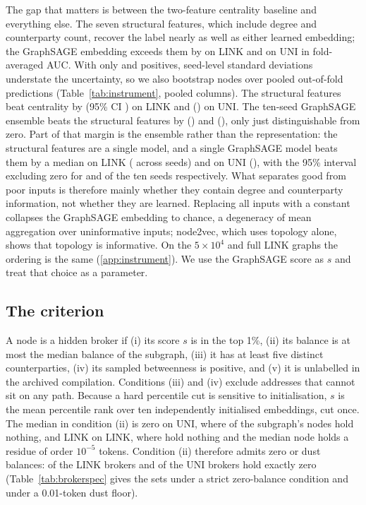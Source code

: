 The gap that matters is between the two-feature centrality baseline and
everything else. The seven structural features, which include degree and
counterparty count, recover the label nearly as well as either learned
embedding; the GraphSAGE embedding exceeds them by  on
LINK and  on UNI in fold-averaged AUC. With only
 and  positives, seed-level standard
deviations understate the uncertainty, so we also bootstrap nodes over pooled
out-of-fold predictions (Table~\ref{tab:instrument}, pooled columns). The
structural features beat centrality by  (95\% CI
) on LINK and 
() on UNI. The ten-seed GraphSAGE ensemble beats
the structural features by 
() and 
(), only just distinguishable from zero. Part of
that margin is the ensemble rather than the representation: the structural
features are a single model, and a single GraphSAGE model beats them by a
median  on LINK ( across
seeds) and  on UNI (), with
the 95\% interval excluding zero for  and
 of the ten seeds respectively. What separates good from poor
inputs is therefore mainly whether they contain degree and counterparty
information, not whether they are learned.
Replacing all inputs with a constant collapses the GraphSAGE embedding to
chance, a degeneracy of mean aggregation over uninformative inputs; node2vec,
which uses topology alone, shows that topology is informative. On the
$5\times10^{4}$ and full LINK graphs the ordering is the same
(\ref{app:instrument}). We use the GraphSAGE score as $s$ and treat that
choice as a parameter.

\subsection{The criterion}
\label{sec:criterion}
A node is a hidden broker if (i) its score $s$ is in the top 1\%, (ii) its
balance is at most the median balance of the subgraph, (iii) it has
at least five distinct counterparties, (iv) its sampled betweenness is
positive, and (v) it is unlabelled in the archived compilation. Conditions
(iii) and (iv) exclude addresses that cannot sit on any path. Because a hard
percentile cut is sensitive to initialisation, $s$ is the mean percentile
rank over ten independently initialised embeddings, cut once.
The median in condition (ii) is zero on UNI, where  of the
subgraph's nodes hold nothing, and  LINK on LINK, where
 hold nothing and the median node holds a residue of order
$10^{-5}$ tokens. Condition (ii) therefore admits zero or
dust balances:  of the LINK brokers and
 of the UNI brokers hold exactly zero
(Table~\ref{tab:brokerspec} gives the sets under a strict zero-balance
condition and under a 0.01-token dust floor).

